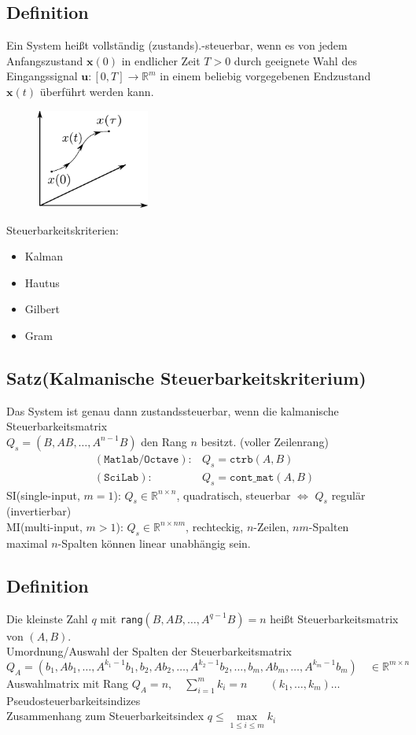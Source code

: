 \documentclass[ngerman]{tudscrreprt}
\begin{document}
\subsection*{Definition} Ein System heißt vollständig (zustands).-steuerbar, wenn es von jedem Anfangszustand $\mathbf{x}(0)$ in endlicher Zeit $T>0$ durch geeignete Wahl des Eingangssignal $\mathbf{u}: [ 0,T] \rightarrow \mathbb{R}^{m}$ in einem beliebig vorgegebenen Endzustand $\mathbf{x}(t)$ überführt werden kann. 
\begin{figure}[H]
\centering
\def\svgwidth{200pt} 
  \includegraphics[width=3.7cm]{image1.pdf}
\end{figure}
Steuerbarkeitskriterien:
\begin{itemize}
\item Kalman
\item Hautus
\item Gilbert
\item Gram
\end{itemize}
\subsection*{Satz(Kalmanische Steuerbarkeitskriterium)}
Das System ist genau dann zustandssteuerbar, wenn die kalmanische Steuerbarkeitsmatrix\\ $Q_s = (B, AB,\dots, A^{n-1}B)$ den Rang $n$ besitzt. (voller Zeilenrang)
\begin{align*}
(\texttt{Matlab/Octave}):& Q_s = \texttt{ctrb}(A,B)\\
(\texttt{SciLab}):& Q_s =\texttt{cont$\_$mat}(A,B)
\end{align*}
SI(single-input, $m=1$): $Q_s \in \mathbb{R}^{n\times n}$, quadratisch, steuerbar $\iff$ $Q_s$ regulär (invertierbar)\\ 
MI(multi-input, $m>1$): $Q_s \in \mathbb{R}^{n\times nm}$, rechteckig, $n$-Zeilen, $nm$-Spalten \\ 
maximal $n$-Spalten können linear unabhängig sein. \\ 
\subsection*{Definition}Die kleinste Zahl $q$ mit \texttt{rang}$(B,AB,\dots, A^{q-1}B) = n$ heißt Steuerbarkeitsmatrix von $(A,B)$. \\ 
Umordnung/Auswahl der Spalten der Steuerbarkeitsmatrix
\begin{equation*}
Q_A = \left( b_1,Ab_1,\dots, A^{k_1 - 1}b_1, b_2, Ab_2,\dots, A^{k_2 - 1}b_2,\dots,b_m,Ab_m,\dots,A^{k_m-1}b_m \right) \quad \in \mathbb{R}^{m\times n}
\end{equation*}
Auswahlmatrix mit Rang $Q_A = n, \quad \sum\limits_{i=1}^{m} k_i = n \qquad (k_1,\dots,k_m)\dots $Pseudosteuerbarkeitsindizes\\ 
Zusammenhang zum Steuerbarkeitsindex $q \le \max\limits_{1\le i\le m}^{} k_i$\\ 
\end{document}
